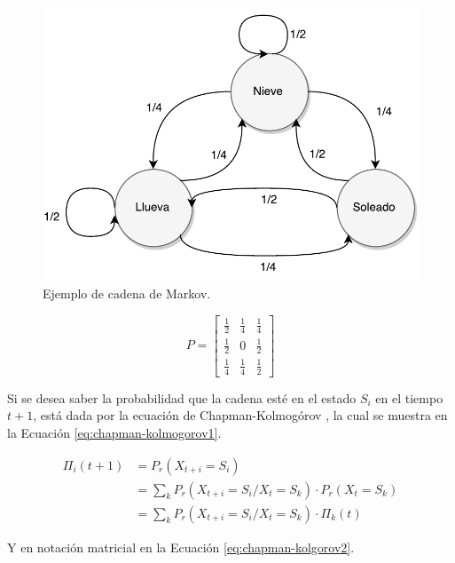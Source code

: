 \begin{figure}[ht!]
	\centering
	\includegraphics[scale=0.5]{images/EjCadenaMarkov.pdf}
	\caption{Ejemplo de cadena de Markov.}
	\label{fig:ejCadenaMarkov}
\end{figure}

\begin{equation} \label{eq:ejCadenaMarkov}
	P =
	\begin{bmatrix}
		\frac{1}{2} & \frac{1}{4} & \frac{1}{4} \\
		\frac{1}{2} & 0 & \frac{1}{2} \\
		\frac{1}{4} & \frac{1}{4} & \frac{1}{2}
	\end{bmatrix}	
\end{equation}

Si se desea saber la probabilidad que la cadena esté en el estado $S_i$ en el tiempo $t+1$, está dada por la ecuación de Chapman-Kolmogórov \citep{Papoulis1984}, la cual se muestra en la Ecuación \ref{eq:chapman-kolmogorov1}.

\begin{equation} \label{eq:chapman-kolmogorov1}
\begin{split}
	\Pi_{i} (t+1) &= P_r(X_{t+i}=S_i) \\
				  &= \sum _{k} P_r(X_{t+i} = S_i / X_t = S_k)·P_r(X_t = S_k)\\
				  &= \sum _{k} P_r(X_{t+i} = S_i / X_t = S_k)·\Pi_{k} (t)
\end{split}	
\end{equation}

Y en notación matricial en la Ecuación \ref{eq:chapman-kolgorov2}.

